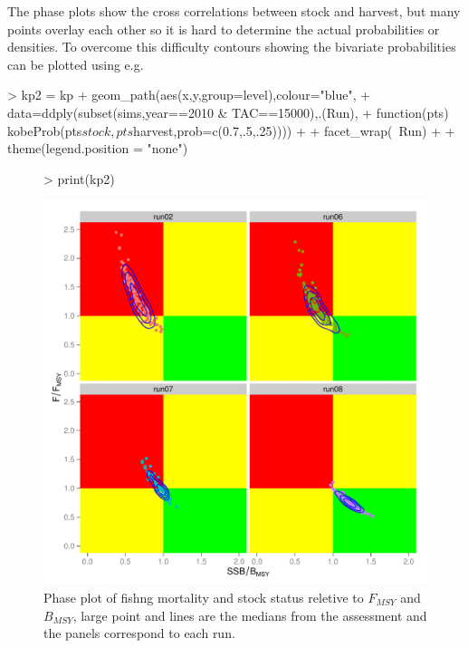 \documentclass[shortnames,nojss,article]{jss}
\begin{document}
The phase plots show the cross correlations between stock and harvest, but many points overlay each other so it is hard
to determine the actual probabilities or densities. To overcome this difficulty contours showing the bivariate probabilities 
can be plotted using  e.g.

\begin{Schunk}
\begin{Sinput}
> kp2 = kp + geom_path(aes(x,y,group=level),colour="blue",
+                     data=ddply(subset(sims,year==2010 & TAC==15000),.(Run), 
+                                function(pts) kobeProb(pts$stock,pts$harvest,prob=c(0.7,.5,.25)))) +
+                     facet_wrap(~Run) + 
+                     theme(legend.position = "none")
\end{Sinput}
\end{Schunk}

\begin{figure}\begin{center}
\begin{Schunk}
\begin{Sinput}
> print(kp2)
\end{Sinput}
\end{Schunk}
\includegraphics{kobe-020}
\caption{Phase plot of fishng mortality and stock status reletive to $F_{MSY}$ and  $B_{MSY}$, large point and lines are the medians
from the assessment and the panels correspond to  each run.}
\end{center}\end{figure}
\end{document}
